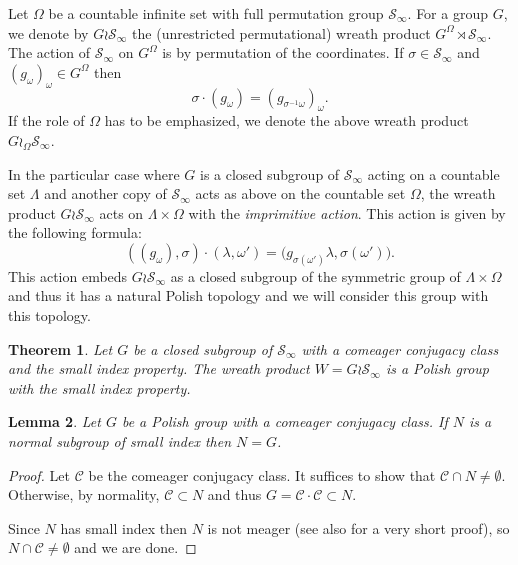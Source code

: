 \documentclass[11pt]{article}
\let\mathcal\mathscr
\theoremstyle{plain}
\newtheorem{thm}{Theorem}[section]
\newtheorem{lem}[thm]{Lemma}
\theoremstyle{definition}
\newcommand{\cC}{\mathcal{C}}
\newcommand{\cS}{\mathcal{S}}
\newcommand{\sinf}{\cS_\infty}
\begin{document}


Let $\Omega$ be a countable infinite set with full permutation group $\sinf$. For a group $G$, we denote by $G\wr \sinf$ the (unrestricted permutational) wreath product $G^\Omega\rtimes\sinf$. The action of $\sinf$ on $G^\Omega$ is by permutation of the coordinates. If $\sigma\in\sinf$ and $(g_\omega)_\omega\in G^\Omega$ then
\[
\sigma\cdot(g_\omega)=(g_{\sigma^{-1}\omega})_\omega.
\]
If the role of $\Omega$ has to be emphasized, we denote the above wreath product $G\wr_\Omega \sinf$.

In the particular case where $G$ is a closed subgroup of $\sinf$ acting on a countable set $\Lambda$ and another copy of $\sinf$ acts as above on the countable set $\Omega$, the wreath product $G\wr\sinf$ acts on $\Lambda\times \Omega$ with the \emph{imprimitive action}. This action is given by the following formula:
\[
\left((g_\omega),\sigma\right)\cdot(\lambda,\omega')=\bigl(g_{\sigma(\omega')}\lambda,\sigma(\omega')\bigr).
\]
This action embeds $G\wr\sinf$ as a closed subgroup of the symmetric group of $\Lambda\times \Omega$ and thus it has a natural Polish topology and we will consider this group with this topology.


\setcounter{thm}{1}
\begin{thm}\label{wr} Let $G$ be a closed subgroup of $\sinf$ with a comeager conjugacy class and the small index property. The wreath product $W=G\wr\sinf$ is a Polish group with the small index property.\end{thm}


\setcounter{thm}{3}
\begin{lem}\label{nsi} Let $G$ be a Polish group with a comeager conjugacy class. If $N$ is a normal subgroup of small index then $N=G$.
\end{lem}

\begin{proof}Let $\cC$ be the comeager conjugacy class. It suffices to show that $\cC\cap N\neq\emptyset$. Otherwise, by normality, $\cC\subset N$ and thus $G=\cC\cdot\cC\subset N$.

Since $N$ has small index then $N$ is not meager \cite[Th.\,4.1]{MR1231710} (see also \cite[Lem.\,6.8]{Kechris-Rosendal} for a very short proof), so $N\cap\cC\neq\emptyset$ and we are done.\end{proof}
\end{document}
